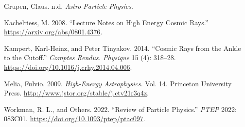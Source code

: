 \documentclass[
  letterpaper,
  DIV=11,
  numbers=noendperiod]{scrreprt}
\newlength{\cslhangindent}
\newenvironment{CSLReferences}[2] %
 {\begin{list}{}{%
  \setlength{\itemindent}{0pt}
  \setlength{\leftmargin}{0pt}
  \setlength{\parsep}{0pt}
  \ifodd #1
   \setlength{\leftmargin}{\cslhangindent}
   \setlength{\itemindent}{-1\cslhangindent}
  \fi
  \setlength{\itemsep}{#2\baselineskip}}}
 {\end{list}}
\begin{document}
\label{refs}
\begin{CSLReferences}{1}{0}
Grupen, Claus. n.d. \emph{Astro Particle Physics}.

Kachelriess, M. 2008. {``Lecture Notes on High Energy Cosmic Rays.''}
\url{https://arxiv.org/abs/0801.4376}.

Kampert, Karl-Heinz, and Peter Tinyakov. 2014. {``Cosmic Rays from the
Ankle to the Cutoff.''} \emph{Comptes Rendus. Physique} 15 (4): 318--28.
\url{https://doi.org/10.1016/j.crhy.2014.04.006}.

Melia, Fulvio. 2009. \emph{High-Energy Astrophysics}. Vol. 14. Princeton
University Press. \url{http://www.jstor.org/stable/j.ctv21r3q4z}.

Workman, R. L., and Others. 2022. {``{Review of Particle Physics}.''}
\emph{PTEP} 2022: 083C01. \url{https://doi.org/10.1093/ptep/ptac097}.

\end{CSLReferences}
\end{document}
